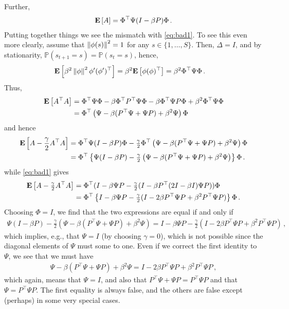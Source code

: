 \documentclass{article}
\newcommand{\Prob}[1]{\mathbb{P}\left(#1\right)}
\begin{document}
Further,
\begin{align*}
\mathbf{E}\left[ A \right]  = \Phi^\top  \Psi (I - \beta P) \Phi\,.
\end{align*}
Putting together things we see the mismatch with \eqref{eq:bad1}.
To see this even more clearly, assume that $ \left\| \phi(s)\right\|^2 = 1$ for any $s\in \{1,\dots,S\}$.
Then, $\Delta = I$, and by stationarity, $\Prob{s_{t+1} = s } = \Prob{s_t=s}$, hence,
\begin{align*}
\mathbf{E}\left[ \beta^2  \left\| \phi\right\|^2 \phi' (\phi')^\top \right] & =
\beta^2 \mathbf{E}\left[ \phi (\phi)^\top \right] =\beta^2 \Phi^\top \Psi \Phi\, .
\end{align*}
Thus, 
\begin{align*}
\mathbf{E}\left[ A^\top A \right] & = 
\Phi^\top  \Psi \Phi -  \beta \Phi^\top P^\top  \Psi \Phi - \beta \Phi^\top  \Psi P \Phi + \beta^2 \Phi^\top \Psi \Phi \\
& = 
\Phi^\top  \left(\Psi -  \beta  (P^\top  \Psi +   \Psi P) + \beta^2 \Psi \right) \Phi \\
\end{align*}
and hence
\begin{align*}
\mathbf{E}\left[ A - \frac{\gamma}{2} A^\top A \right] & = 
 \Phi^\top \Psi(I - \beta P) \Phi - \tfrac{\gamma}{2} 
 \Phi^\top  \left(\Psi -  \beta  (P^\top  \Psi +   \Psi P) + \beta^2 \Psi \right) \Phi \\
& = 
\Phi^\top  \left\{ \Psi (I - \beta P)- \tfrac{\gamma}{2} 
\left(\Psi -  \beta  (P^\top  \Psi +   \Psi P) + \beta^2 \Psi \right) \right\} \Phi \,.
\end{align*}
while \eqref{eq:bad1} gives
\begin{align*}
\mathbf{E}\left[ A - \tfrac{\gamma}{2} A^\top A  \right] 
& = \Phi^\top (I - \beta \Psi P - \tfrac{\gamma}{2}(I - \beta P^\top (2I - \beta I)\Psi P) ) \Phi \\
& = \Phi^\top \left\{I - \beta \Psi P - \tfrac{\gamma}{2}(I - 2 \beta P^\top\Psi P  +  \beta^2 P^\top \Psi P) \right\} \Phi\,.
\end{align*}
Choosing $\Phi = I$, we find that the two expressions are equal if and only if
\begin{align*}
 \Psi (I - \beta P)- \tfrac{\gamma}{2} \left( \Psi -  \beta  (P^\top  \Psi +   \Psi P) + \beta^2 \Psi \right)
= 
I - \beta \Psi P - \tfrac{\gamma}{2}(I - 2 \beta P^\top\Psi P  +  \beta^2 P^\top \Psi P)\,,
\end{align*}
which implies, e.g., that $\Psi=I$ (by choosing $\gamma=0$), which is not possible since the diagonal elements of $\Psi$ must some to one.
Even if we correct the first identity to $\Psi$, we see that we must have
\begin{align*}
 \Psi -  \beta  (P^\top  \Psi +   \Psi P) + \beta^2 \Psi 
 = I - 2 \beta P^\top\Psi P  +  \beta^2 P^\top \Psi P\,,
\end{align*}
which again, means that $\Psi = I$, and also that $P^\top \Psi + \Psi P = P^\top \Psi P$ and that $\Psi = P^\top \Psi P$.
The first equality is always false, and the others are false except (perhaps) in some very special cases.
\end{document}

